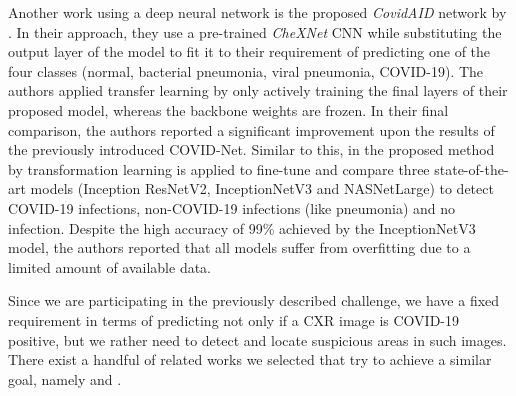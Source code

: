 Another work using a deep neural network is the proposed \textit{CovidAID} \autocite{mangal2020covidaid} network by \citeauthor{mangal2020covidaid}. In their approach, they use a pre-trained \textit{CheXNet} \autocite{rajpurkar2017chexnet} \ac{CNN} while substituting the output layer of the model to fit it to their requirement of predicting one of the four classes (normal, bacterial pneumonia, viral pneumonia, COVID-19). The authors applied transfer learning by only actively training the final layers of their proposed model, whereas the backbone weights are frozen.
In their final comparison, the authors reported a significant improvement upon the results of the previously introduced COVID-Net.
Similar to this, in the proposed method \autocite{CoronaDLTransfer} by \citeauthor{CoronaDLTransfer} transformation learning is applied to fine-tune and compare three state-of-the-art models (Inception ResNetV2, InceptionNetV3 and NASNetLarge) to detect COVID-19 infections, non-COVID-19 infections (like pneumonia) and no infection. Despite the high accuracy of 99\% achieved by the InceptionNetV3 model, the authors reported that all models suffer from overfitting due to a limited amount of available data.

Since we are participating in the previously described challenge, we have a fixed requirement in terms of predicting not only if a \ac{CXR} image is COVID-19 positive, but we rather need to detect and locate suspicious areas in such images. There exist a handful of related works we selected that try to achieve a similar goal, namely \autocite{brunese2020explainable, fan2020inf} and \autocite{al2021fast}.

